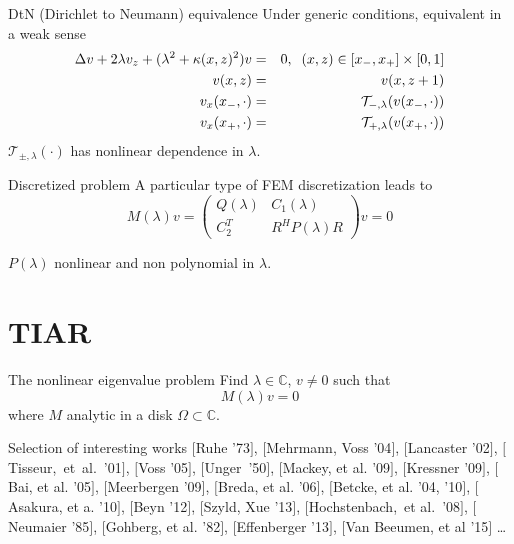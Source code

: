 \documentclass{beamer}
\newcommand{\CC}{\mathbb{C}}
\newcommand{\mycite}[1]{$[$#1$]$}
\begin{document}
\begin{frame}

\begin{block}{DtN (Dirichlet to Neumann) equivalence}
 Under generic conditions, equivalent in a weak sense
\vspace{-0.1cm}\small \begin{eqnarray*} \hspace{-0cm}
\Delta v+2\lambda v_z+(\lambda^2+\kappa(x,z)^2)v&=&0,
\;\; (x,z)\in[x_-,x_+]\times [0,1]\\
  v(x,z)&=&v(x,z+1)\\
  v_x(x_-,\cdot)&=&\mathcal{T}_{-,\lambda}(v(x_-,\cdot))\\
  v_x(x_+,\cdot)&=&\mathcal{T}_{+,\lambda}(v(x_+,\cdot))
\end{eqnarray*}
$\mathcal{T}_{\pm,\lambda}(\cdot)$ has nonlinear dependence in $\lambda$.
\end{block}

\begin{block}{Discretized problem}
 A particular type of FEM discretization leads to 
\[
  M(\lambda)v=
  \begin{pmatrix}
    Q(\lambda) & C_1 (\lambda)\\
    C_2^T & R^HP(\lambda)R
  \end{pmatrix} v = 0
\]
\end{block}
$P(\lambda)$ nonlinear and non polynomial in $\lambda$. 
\end{frame}

\section{TIAR}




\begin{frame}
\begin{block}{The nonlinear eigenvalue problem}
Find $\lambda\in\CC$, $v\neq 0$ such that
\begin{equation*}
  M(\lambda)v=0
\end{equation*}
where $M$ analytic in a disk $\Omega\subset\CC$. \\
\end{block}
\begin{block}{Selection of interesting works}
\small  \mycite{Ruhe '73}, \mycite{Mehrmann, Voss '04},
\mycite{Lancaster '02}, 
\mycite{Tisseur,~et~al.~'01}, \mycite{Voss '05}, \mycite{Unger~'50}, \mycite{Mackey, et al. '09}, 
\mycite{Kressner '09}, 
\mycite{Bai, et al. '05}, \mycite{Meerbergen '09}, \mycite{Breda, et al. '06},
\mycite{Betcke, et al. '04, '10}, 
\mycite{Asakura, et a. '10}, 
\mycite{Beyn '12}, \mycite{Szyld, Xue '13},
\mycite{Hochstenbach,~et al.~'08}, \mycite{Neumaier '85},
\mycite{Gohberg, et al. '82}, \mycite{Effenberger '13},
\mycite{Van Beeumen, et al '15}
\ldots
\end{block}
\end{frame}
\end{document}
